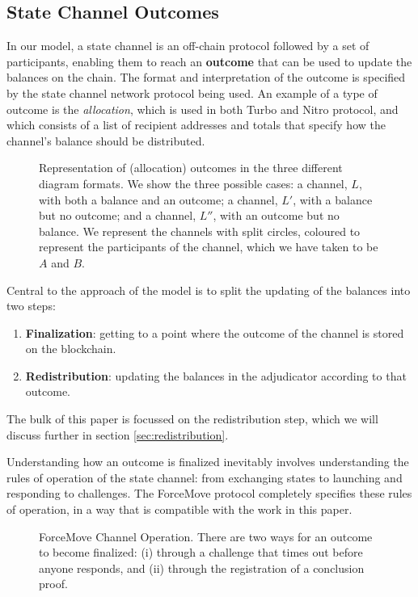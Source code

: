 \subsection{State Channel Outcomes}

In our model, a state channel is an off-chain protocol followed by a set of participants,
enabling them to reach an \textbf{outcome} that can be used to update the balances on the chain.
The format and interpretation of the outcome is specified by the state channel network protocol being used.
An example of a type of outcome is the \textit{allocation}, which is used in both Turbo and Nitro protocol, and which consists of a list of recipient addresses and totals that specify how the channel's balance should be distributed.

\begin{figure}[h]\centering
  \makebox[\textwidth][c]{}
  \caption{
    Representation of (allocation) outcomes in the three different diagram formats.
    We show the three possible cases: a channel, $L$, with both a balance and an outcome;
    a channel, $L'$, with a balance but no outcome; 
    and a channel, $L''$, with an outcome but no balance.
    We represent the channels with split circles, coloured to represent the participants of the channel, which we have taken to be $A$ and $B$.
  }\label{fig:outcome-notation}
\end{figure} 

Central to the approach of the model is to split the updating of the balances into two steps:
\begin{enumerate}
\item \textbf{Finalization}: getting to a point where the outcome of the channel is stored on the blockchain.
\item \textbf{Redistribution}: updating the balances in the adjudicator according to that outcome.
\end{enumerate}

The bulk of this paper is focussed on the redistribution step, which we will discuss further in section \ref{sec:redistribution}.

Understanding how an outcome is finalized inevitably involves understanding the rules of operation of the state channel: from exchanging states to launching and responding to challenges.
The ForceMove protocol completely specifies these rules of operation, in a way that is compatible with the work in this paper.

\begin{figure}[h]\centering
  

  \caption{
    ForceMove Channel Operation. There are two ways for an outcome to become finalized: (i) through a challenge that times out before anyone responds, and (ii) through the registration of a conclusion proof.
  }\label{fig:modes}
\end{figure}

